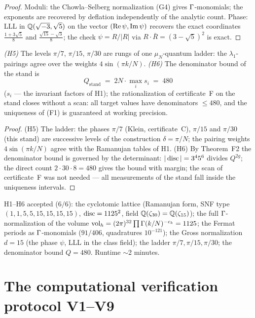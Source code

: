 \begin{proof}
Moduli: the Chowla--Selberg normalization (G4) gives
$\Gamma$-monomials; the exponents are recovered by deflation
independently of the analytic count. Phase: LLL in
$\mathbb{Q}(\sqrt{-3},\sqrt5)$ on the vector $(\operatorname{Re}\psi,\operatorname{Im}\psi)$ recovers
the exact coordinates $\frac{1+3\sqrt5}{8}$ and
$\frac{\sqrt{15}-\sqrt3}{8}$; the check $\psi=R/|R|$ via
$R\cdot\bar R=(3-\sqrt5)^2$ is exact.
\end{proof}

\begin{theorem}
\label{th:H56}
\emph{(H5)} The levels $\pi/7$, $\pi/15$, $\pi/30$ are rungs of one
$\mu_N$-quantum ladder: the $\lambda_1$-pairings agree over the
weights $4\sin(\pi k/N)$. \emph{(H6)} The denominator bound of the
stand is
\[
  Q_{\text{stand}} \;=\; 2N\cdot\max_i s_i \;=\; 480
\]
($s_i$ --- the invariant factors of H1); the rationalization of
certificate~F on the stand closes without a scan: all target values
have denominators $\le480$, and the uniqueness of (F1) is guaranteed
at working precision.
\end{theorem}

\begin{proof}
(H5) The ladder: the phases $\pi/7$ (Klein, certificate~C), $\pi/15$
and $\pi/30$ (this stand) are successive levels of the construction
$\delta=\pi/N$; the pairing weights $4\sin(\pi k/N)$ agree with the
Ramanujan tables of H1. (H6) By Theorem~F2 the denominator bound is
governed by the determinant: $|\operatorname{disc}|=3^4 5^6$ divides $Q^{2g}$; the
direct count $2\cdot30\cdot8=480$ gives the bound with margin; the
scan of certificate~F was not needed --- all measurements of the
stand fall inside the uniqueness intervals.
\end{proof}

\begin{statusbox}
H1--H6 accepted ($6/6$): the cyclotomic lattice (Ramanujan form,
SNF type $(1,1,5,5,15,15,15,15)$, $\operatorname{disc}=1125^2$, field
$\mathbb{Q}(\zeta_{30})=\mathbb{Q}(\zeta_{15})$); the full $\Gamma$-normalization of
the volume $\mathrm{vol}_h=(2\pi)^{32}\prod\Gamma(k/N)^{-c_k}=1125$;
the Fermat periods as $\Gamma$-monomials ($91/406$, quadratures
$10^{-121}$); the Gross normalization $d=15$ (the phase $\psi$, LLL
in the class field); the ladder $\pi/7,\pi/15,\pi/30$; the
denominator bound $Q=480$. Runtime $\sim$2 minutes.
\end{statusbox}

\section{The computational verification protocol V1--V9}
\label{sec:protocol}

